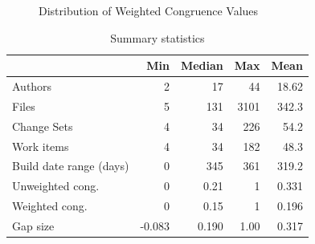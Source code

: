 \begin{figure}[t]
  \centering  
	\caption{Distribution of Weighted Congruence Values}
	\label{fig:hist_weighted_congruence}
\end{figure}

\begin{table}[t]
\centering
\begin{tabular}{l|rrrr}
 & Min & Median & Max & Mean\\\hline
Authors & 2 & 17 & 44 & 18.62\\
Files & 5 & 131 & 3101 & 342.3 \\
Change Sets & 4  & 34  & 226 & 54.2\\
Work items & 4 & 34  & 182 & 48.3 \\
Build date range (days) & 0  & 345  & 361 & 319.2 \\
Unweighted cong. & 0  & 0.21  & 1 & 0.331 \\
Weighted cong. & 0 & 0.15  & 1 & 0.196\\
Gap size & -0.083 & 0.190 & 1.00 & 0.317 \\
\hline
\end{tabular}
\caption{Summary statistics}
\label{tab:summary}
\end{table}

